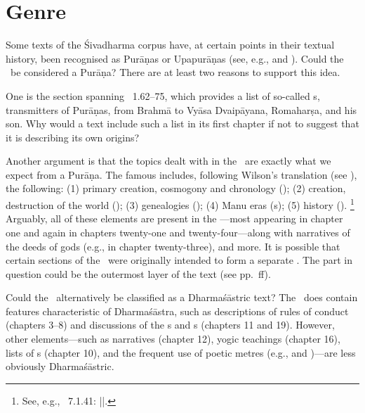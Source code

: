 \section{Genre}

Some texts of the Śivadharma corpus have, at certain points in their textual history,
been recognised as Purāṇas or Upapurāṇas (see, e.g.,  and \citeyear{HazraSDhU}).
Could the \VSS\ be considered a Purāṇa? There are at least two reasons to support this idea.

One is the section spanning \VSS\ 1.62--75, which provides a list of so-called s,
transmitters of Purāṇas, from Brahmā to Vyāsa Dvai\-pā\-yana, Romaharṣa, and his son.
Why would a text include such a list in its first chapter 
if not to suggest that it is describing its own origins?

Another argument is that the topics dealt with in the \VSS\ are exactly what
we expect from a Purāṇa. The famous  includes,
following Wilson's translation (see ), the following:
(1) primary creation, cosmogony and chronology (); 
(2) creation, destruction of the world ();
(3) genealogies (); 
(4) Manu eras (s);
(5) history ().%
		\footnote{See, e.g., \SivP\ 7.1.41: 
                         ||.}
Arguably, all of these elements are present in the \VSS---most
appearing in chapter one and again in chapters twenty-one and
twenty-four---along with narratives of the deeds of gods
(e.g., in chapter twenty-three), and more. It is possible
that certain sections of the \VSS\ were originally intended
to form a separate . The part in question could
be the outermost layer of the text (see pp.~\pageref{structure}ff).



Could the \VSS\ alternatively be classified as a Dharmaśāstric text?
The \VSS\ does contain features characteristic of Dharmaśāstra,
such as descriptions of rules of conduct (chapters 3--8) and discussions of the 
s and s (chapters 11 and 19).
However, other elements---such as narratives (chapter 12),
yogic teachings (chapter 16), lists of s (chapter 10), 
and the frequent use of poetic metres (e.g.,  and
)---are less obviously Dharmaśāstric.

